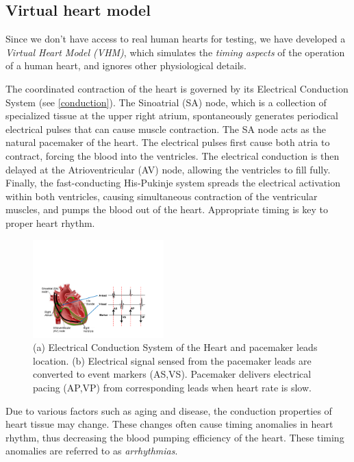 \subsection{Virtual heart model}
\label{heartmodel}

Since we don't have access to real human hearts for testing, we have developed a \emph{Virtual Heart Model (VHM)}, which simulates the \emph{timing aspects} of the operation of a human heart, and ignores other physiological details.

The coordinated contraction of the heart is governed by its Electrical Conduction System (see \ref{conduction}). The Sinoatrial (SA) node, which is a collection of specialized tissue at the upper right atrium, spontaneously generates periodical electrical pulses that can cause muscle contraction. 
The SA node acts as the natural pacemaker of the heart. 
The electrical pulses first cause both atria to contract, forcing the blood into the ventricles. 
The electrical conduction is then delayed at the Atrioventricular (AV) node, allowing the ventricles to fill fully. Finally, the fast-conducting His-Pukinje system spreads the electrical activation within both ventricles, causing simultaneous contraction of the ventricular muscles, and pumps the blood out of the heart. 
Appropriate timing is key to proper heart rhythm.

\begin{figure}
	\begin{center}
		\includegraphics[width=0.45\textwidth]{figures/egm.pdf}
	\end{center}
	\caption{\small (a) Electrical Conduction System of the Heart and pacemaker leads location. (b) Electrical signal sensed from the pacemaker leads are converted to event markers (AS,VS). Pacemaker delivers electrical pacing (AP,VP) from corresponding leads when heart rate is slow.}
	\label{fig:conduction}
\end{figure}

Due to various factors such as aging and disease, the conduction properties of heart tissue may change. 
These changes often cause timing anomalies in heart rhythm, thus decreasing the blood pumping efficiency of the heart. These timing anomalies are referred to as \emph{arrhythmias}.  